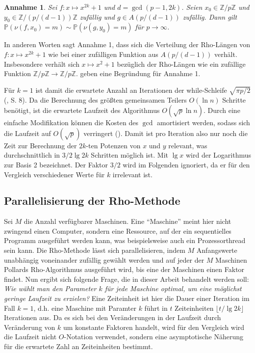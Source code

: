 \documentclass[a4paper, 10pt, ngerman]{article}
\newcommand{\Z}{\mathbb{Z}}
\renewcommand{\P}{\mathbb{P}}
\newtheorem{assumption}{Annahme}
\begin{document}
\begin{assumption}
    Sei $f : x \mapsto x^{2k} + 1$ und $d = \gcd(p - 1, 2k)$. Seien $x_0 \in \Z/p\Z$ und $y_0 \in \Z/(p/(d - 1))\Z$ zufällig und $g \in A(p/(d - 1))$ zufällig. Dann gilt $\P(\nu(f, x_0) = m) \sim \P(\nu(g, y_0) = m)$ für $p \to \infty$.
\end{assumption}

\noindent In anderen Worten sagt Annahme 1, dass sich die Verteilung der Rho-Längen von $f : x \mapsto x^{2k} + 1$ wie bei einer zufälligen Funktion aus $A(p/(d - 1))$ verhält. Insbesondere verhält sich $x \mapsto x^2 + 1$ bezüglich der Rho-Längen wie ein zufällige Funktion $\Z/p\Z \to \Z/p\Z$. \cite{bp81} geben eine Begründung für Annahme 1.

Für $k = 1$ ist damit die erwartete Anzahl an Iterationen der while-Schleife $\sqrt{\pi p / 2}$ (\cite{knu98}, S. 8). Da die Berechnung des größten gemeinsamen Teilers $O(\ln n)$ Schritte benötigt, ist die erwartete Laufzeit des Algorithmus $O(\sqrt p \ln n)$. Durch eine einfache Modifikation können die Kosten des $\gcd$ amortisiert werden, sodass sich die Laufzeit auf $O(\sqrt p)$ verringert (\cite{bre80}). Damit ist pro Iteration also nur noch die Zeit zur Berechnung der $2k$-ten Potenzen von $x$ und $y$ relevant, was durchschnittlich in $3/2 \lg 2k$ Schritten möglich ist. Mit $\lg x$ wird der Logarithmus zur Basis 2 bezeichnet. Der Faktor $3/2$ wird im Folgenden ignoriert, da er für den Vergleich verschiedener Werte für $k$ irrelevant ist.

\subsection{Parallelisierung der Rho-Methode}

Sei $M$ die Anzahl verfügbarer Maschinen. Eine "`Maschine"'  meint hier nicht zwingend einen Computer, sondern eine Ressource, auf der ein sequentielles Programm ausgeführt werden kann, was beispielsweise auch ein Prozessorthread sein kann. Die Rho-Methode lässt sich parallelisieren, indem $M$ Anfangswerte unabhängig voneinander zufällig gewählt werden und auf jeder der $M$ Maschinen Pollards Rho-Algorithmus ausgeführt wird, bis eine der Maschinen einen Faktor findet. Nun ergibt sich folgende Frage, die in dieser Arbeit behandelt werden soll: \emph{Wie wählt man den Parameter $k$ für jede Maschine optimal, um eine möglichst geringe Laufzeit zu erzielen?} Eine Zeiteinheit ist hier die Dauer einer Iteration im Fall $k = 1$, d.h. eine Maschine mit Paramter $k$ führt in $t$ Zeiteinheiten $\lfloor t / \lg 2k \rfloor$ Iterationen aus. Da es sich bei den Veränderungen in der Laufzeit durch Veränderung von $k$ um konstante Faktoren handelt, wird für den Vergleich wird die Laufzeit nicht $O$-Notation verwendet, sondern eine asymptotische Näherung für die erwartete Zahl an Zeiteinheiten bestimmt.
\end{document}
